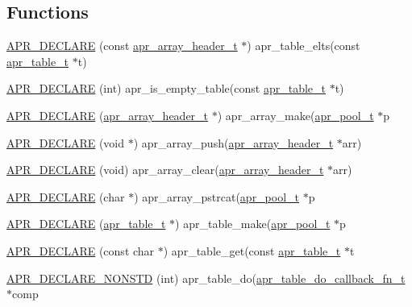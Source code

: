 \subsection*{Functions}
\begin{DoxyCompactItemize}
\item 
\mbox{\hyperlink{group__apr__tables_ga9511e4ca61f34976bb986a3c46b589de}{A\+P\+R\+\_\+\+D\+E\+C\+L\+A\+RE}} (const \mbox{\hyperlink{structapr__array__header__t}{apr\+\_\+array\+\_\+header\+\_\+t}} $\ast$) apr\+\_\+table\+\_\+elts(const \mbox{\hyperlink{group__apr__tables_gad7ea82d6608a4a633fc3775694ab71e4}{apr\+\_\+table\+\_\+t}} $\ast$t)
\item 
\mbox{\hyperlink{group__apr__tables_ga24a036e42e589a90022bf1ec1158113b}{A\+P\+R\+\_\+\+D\+E\+C\+L\+A\+RE}} (int) apr\+\_\+is\+\_\+empty\+\_\+table(const \mbox{\hyperlink{group__apr__tables_gad7ea82d6608a4a633fc3775694ab71e4}{apr\+\_\+table\+\_\+t}} $\ast$t)
\item 
\mbox{\hyperlink{group__apr__tables_gaae3cc795193b58c8995d1bc65c7851b3}{A\+P\+R\+\_\+\+D\+E\+C\+L\+A\+RE}} (\mbox{\hyperlink{structapr__array__header__t}{apr\+\_\+array\+\_\+header\+\_\+t}} $\ast$) apr\+\_\+array\+\_\+make(\mbox{\hyperlink{group__apr__pools_gaf137f28edcf9a086cd6bc36c20d7cdfb}{apr\+\_\+pool\+\_\+t}} $\ast$p
\item 
\mbox{\hyperlink{group__apr__tables_ga2de0308124f1ed080a6c373e993b5cae}{A\+P\+R\+\_\+\+D\+E\+C\+L\+A\+RE}} (void $\ast$) apr\+\_\+array\+\_\+push(\mbox{\hyperlink{structapr__array__header__t}{apr\+\_\+array\+\_\+header\+\_\+t}} $\ast$arr)
\item 
\mbox{\hyperlink{group__apr__tables_ga147e24e5f1f9f5bb7d7d11381291bba5}{A\+P\+R\+\_\+\+D\+E\+C\+L\+A\+RE}} (void) apr\+\_\+array\+\_\+clear(\mbox{\hyperlink{structapr__array__header__t}{apr\+\_\+array\+\_\+header\+\_\+t}} $\ast$arr)
\item 
\mbox{\hyperlink{group__apr__tables_ga76c651e5101e99d13ab524734b2cead1}{A\+P\+R\+\_\+\+D\+E\+C\+L\+A\+RE}} (char $\ast$) apr\+\_\+array\+\_\+pstrcat(\mbox{\hyperlink{group__apr__pools_gaf137f28edcf9a086cd6bc36c20d7cdfb}{apr\+\_\+pool\+\_\+t}} $\ast$p
\item 
\mbox{\hyperlink{group__apr__tables_ga2fd1a47e4d1d3dc2eec1ffec470a0f30}{A\+P\+R\+\_\+\+D\+E\+C\+L\+A\+RE}} (\mbox{\hyperlink{group__apr__tables_gad7ea82d6608a4a633fc3775694ab71e4}{apr\+\_\+table\+\_\+t}} $\ast$) apr\+\_\+table\+\_\+make(\mbox{\hyperlink{group__apr__pools_gaf137f28edcf9a086cd6bc36c20d7cdfb}{apr\+\_\+pool\+\_\+t}} $\ast$p
\item 
\mbox{\hyperlink{group__apr__tables_gae5df6767d4348ac55d933a7b29333239}{A\+P\+R\+\_\+\+D\+E\+C\+L\+A\+RE}} (const char $\ast$) apr\+\_\+table\+\_\+get(const \mbox{\hyperlink{group__apr__tables_gad7ea82d6608a4a633fc3775694ab71e4}{apr\+\_\+table\+\_\+t}} $\ast$t
\item 
\mbox{\hyperlink{group__apr__tables_gab02b0393c878208ff6cb55c701ff536a}{A\+P\+R\+\_\+\+D\+E\+C\+L\+A\+R\+E\+\_\+\+N\+O\+N\+S\+TD}} (int) apr\+\_\+table\+\_\+do(\mbox{\hyperlink{group__apr__tables_ga633325e16f9e1f81adce476fb71cbd88}{apr\+\_\+table\+\_\+do\+\_\+callback\+\_\+fn\+\_\+t}} $\ast$comp
\end{DoxyCompactItemize}
